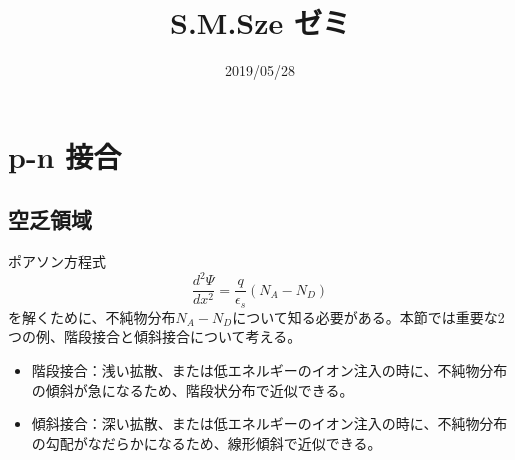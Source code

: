\documentclass[10pt]{ujarticle}
\title{S.M.Sze ゼミ}
\author{}
\date{2019/05/28}
\begin{document}
\maketitle
\section{p-n 接合}
\subsection{空乏領域}
ポアソン方程式
\begin{equation}
  \frac{d^2 \Psi}{dx^2} = \frac{q}{\epsilon_s} (N_A - N_D)
\end{equation}
を解くために、不純物分布$N_A-N_D$について知る必要がある。本節では重要な2つの例、階段接合と傾斜接合について考える。\\
\begin{itemize}
  \item 階段接合：浅い拡散、または低エネルギーのイオン注入の時に、不純物分布の傾斜が急になるため、階段状分布で近似できる。
  \item 傾斜接合：深い拡散、または低エネルギーのイオン注入の時に、不純物分布の勾配がなだらかになるため、線形傾斜で近似できる。
\end{itemize}
\end{document}
